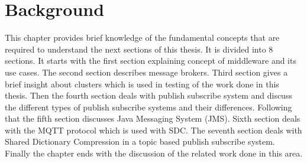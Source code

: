 \chapter{Background}\label{chapter:background}

This chapter provides brief knowledge of the fundamental concepts that are required to understand the next sections of this thesis. It is divided into 8 sections. It starts with the first section explaining concept of middleware and its use cases. The second section describes message brokers. Third section gives a brief insight about clusters which is used in testing of the work done in this thesis. Then the fourth section deals with publish subscribe system and discuss the different types of publish subscribe systems and their differences. Following that the fifth section discusses Java Messaging System (JMS). Sixth section deals with the MQTT protocol which is used with SDC. The seventh section deals with Shared Dictionary Compression in a topic based publish subscribe system. Finally the chapter ends with the discussion of the related work done in this area.
